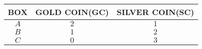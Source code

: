 \begin{tabular}{|c|c|c|}
\hline
 \textbf{BOX} & \textbf{GOLD COIN(GC)} & \textbf{SILVER COIN(SC)}\\
\hline
 $A$ & $2$ & $1$\\
\hline
 $B$ & $1$ & $2$\\
\hline
 $C$ & $0$ & $3$\\
\hline
\end{tabular}\\
